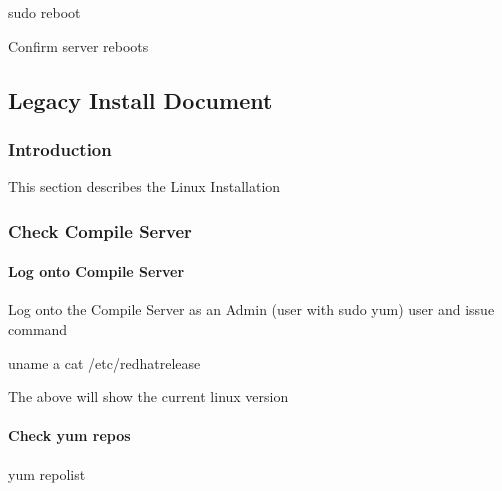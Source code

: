 \documentclass[letterpaper,10pt,english]{sphinxmanual}
\begin{document}
\begin{sphinxVerbatim}[commandchars=\\\{\}]
sudo reboot
\end{sphinxVerbatim}

\sphinxAtStartPar
{} Confirm server reboots


\subsection{Legacy Install Document}
\label{\detokenize{legacy/legacy-install:legacy-install-document}}\label{\detokenize{legacy/legacy-install::doc}}

\subsubsection{Introduction}
\label{\detokenize{legacy/legacy-install:introduction}}
\sphinxAtStartPar
This section describes the Linux Installation


\subsubsection{Check Compile Server}
\label{\detokenize{legacy/legacy-install:check-compile-server}}

\paragraph{Log onto Compile Server}
\label{\detokenize{legacy/legacy-install:log-onto-compile-server}}
\sphinxAtStartPar
Log onto the Compile Server as an Admin (user with sudo yum) user and issue command

\begin{sphinxVerbatim}[commandchars=\\\{\}]
uname \PYGZhy{}a
cat /etc/redhat\PYGZhy{}release
\end{sphinxVerbatim}

\sphinxAtStartPar
The above will show the current linux version


\paragraph{Check yum repos}
\label{\detokenize{legacy/legacy-install:check-yum-repos}}
\begin{sphinxVerbatim}[commandchars=\\\{\}]
yum repolist
\end{sphinxVerbatim}
\end{document}
